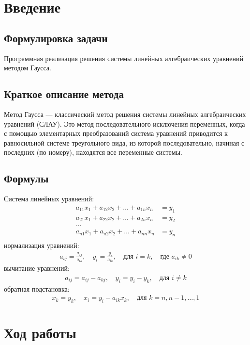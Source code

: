 \documentclass[12pt,a4paper]{scrartcl}
\begin{document}
\section{Введение}
\label{sec:intro}

\subsection{Формулировка задачи}
Программная реализация решения системы линейных алгебраических уравнений методом Гаусса.
\subsection{Краткое описание метода}
Метод Гаусса — классический метод решения системы линейных алгебраических уравнений (СЛАУ). Это метод последовательного исключения переменных, когда с помощью элементарных преобразований система уравнений приводится к равносильной системе треугольного вида, из которой последовательно, начиная с последних (по номеру), находятся все переменные системы.
\subsection{Формулы}
\label{sec:mathexample}

Система линейных уравнений:
\begin{align*}
a_{11}x_1 + a_{12}x_2 + \ldots + a_{1n}x_n &= y_1 \\
a_{21}x_1 + a_{22}x_2 + \ldots + a_{2n}x_n &= y_2 \\
\ldots \\
a_{n1}x_1 + a_{n2}x_2 + \ldots + a_{nn}x_n &= y_n \\
\end{align*}
нормализация уравнений:
\begin{align*}
a_{ij} = \frac{a_{ij}}{a_{ik}}, \quad y_i = \frac{y_i}{a_{ik}}, \quad \text{для } i = k, \quad \text{где } a_{ik} \neq 0
\end{align*}
вычитание уравнений:
\begin{align*}
a_{ij} = a_{ij} - a_{kj}, \quad y_i = y_i - y_k, \quad \text{для } i \neq k
\end{align*}
обратная подстановка:
\begin{align*}
x_k = y_k, \quad x_i = y_i - a_{ik}x_k, \quad \text{для } k = n, n-1, \ldots, 1
\end{align*}

\label{sec:picexample}

\section{Ход работы}
\label{sec:exp}
\end{document}
